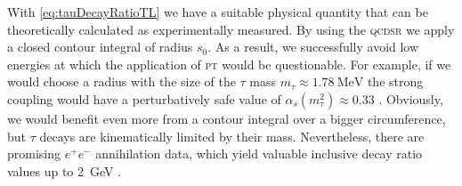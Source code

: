 \documentclass[../../index.tex]{subfiles}
\begin{document}
With \cref{eq:tauDecayRatioTL} we have a suitable physical quantity that can be
theoretically calculated as experimentally measured. By using the \textsc{qcdsr}
we apply a closed contour integral of radius \(s_0\). As a result, we
successfully avoid low energies at which the application of \textsc{pt} would
be questionable. For example, if we would choose a radius with the size of the
\(\tau\) mass \(m_\tau \approx \SI{1.78}{\mega\eV}\) the strong coupling would
have a perturbatively safe value of \(\alpha_s(m_\tau^2)\approx 0.33\)
\cite{Pich2016}. Obviously, we would benefit even more from a contour integral
over a bigger circumference, but \(\tau\) decays are kinematically limited by
their mass. Nevertheless, there are promising \(e^+e^-\) annihilation data, which
yield valuable inclusive decay ratio values up to \SI{2}{\giga\eV}
\cite{Boito2018}\cite{Keshavarzi2018}.
\end{document}
